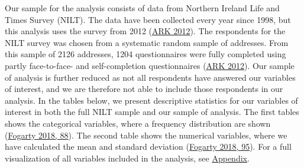 \documentclass[
]{article}
\begin{document}
Our sample for the analysis consists of data from Northern Ireland Life
and Times Survey (NILT). The data have been collected every year since
1998, but this analysis uses the survey from 2012
(\protect\hyperlink{ref-ark_2012}{ARK 2012}). The respondents for the
NILT survey was chosen from a systematic random sample of addresses.
From this sample of 2126 addresses, 1204 questionnaires were fully
completed using partly face-to-face- and self-completion questionnaires
(\protect\hyperlink{ref-ark_2012}{ARK 2012}). Our sample of analysis is
further reduced as not all respondents have answered our variables of
interest, and we are therefore not able to include those respondents in
our analysis. In the tables below, we present descriptive statistics for
our variables of interest in both the full NILT sample and our sample of
analysis. The first tables shows the categorical variables, where a
frequency distribution are shown
(\protect\hyperlink{ref-fogarty2018quantitative}{Fogarty 2018, 88}). The
second table shows the numerical variables, where we have calculated the
mean and standard deviation
(\protect\hyperlink{ref-fogarty2018quantitative}{Fogarty 2018, 95}). For
a full visualization of all variables included in the analysis, see
\protect\hyperlink{appendix}{Appendix}.
\end{document}
